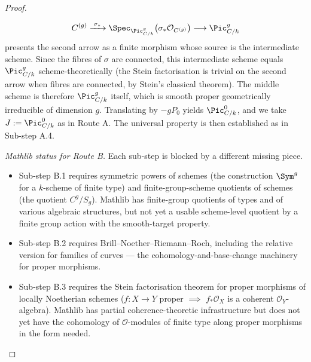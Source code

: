 \begin{proof}
\begin{itemize}
    \[
      C^{(g)} \xrightarrow{\;\sigma_*\;} \Spec_{\Pic^g_{C/k}}\bigl(\sigma_* \mathcal O_{C^{(g)}}\bigr) \longrightarrow \Pic^g_{C/k}
    \]
    presents the second arrow as a finite morphism whose source is the intermediate scheme. Since the fibres of \(\sigma\) are connected, this intermediate scheme equals \(\Pic^g_{C/k}\) scheme-theoretically (the Stein factorisation is trivial on the second arrow when fibres are connected, by Stein's classical theorem). The middle scheme is therefore \(\Pic^g_{C/k}\) itself, which is smooth proper geometrically irreducible of dimension \(g\). Translating by \(-g P_0\) yields \(\Pic^0_{C/k}\), and we take \(J := \Pic^0_{C/k}\) as in Route A. The universal property is then established as in Sub-step A.4.
  \end{itemize}
  \emph{Mathlib status for Route B.} Each sub-step is blocked by a different missing piece.
  \begin{itemize}
    \item Sub-step B.1 requires symmetric powers of schemes (the construction \(\Sym^g\) for a \(k\)-scheme of finite type) and finite-group-scheme quotients of schemes (the quotient \(C^g / S_g\)). Mathlib has finite-group quotients of types and of various algebraic structures, but not yet a usable scheme-level quotient by a finite group action with the smooth-target property.
    \item Sub-step B.2 requires Brill--Noether--Riemann--Roch, including the relative version for families of curves --- the cohomology-and-base-change machinery for proper morphisms.
    \item Sub-step B.3 requires the Stein factorisation theorem for proper morphisms of locally Noetherian schemes (\(f \colon X \to Y\) proper \(\implies\) \(f_* \mathcal O_X\) is a coherent \(\mathcal O_Y\)-algebra). Mathlib has partial coherence-theoretic infrastructure but does not yet have the cohomology of \(\mathcal O\)-modules of finite type along proper morphisms in the form needed.
  \end{itemize}

\end{proof}
